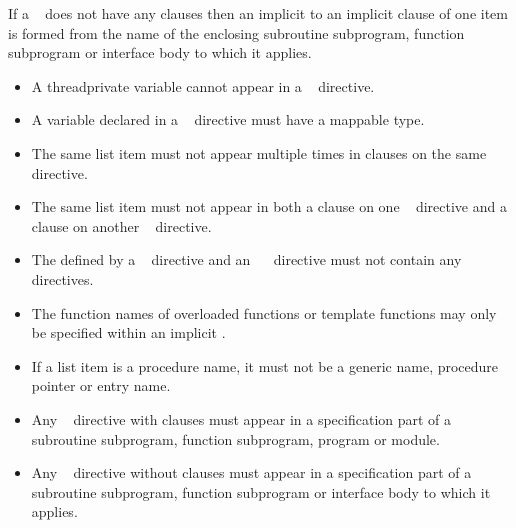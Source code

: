 {{{{If a ~ does not have any clauses then an implicit 
 to an implicit  clause of one item is formed from
the name of the enclosing subroutine subprogram, function subprogram or 
interface body to which it applies.
\fortranspecificend

\restrictions
\begin{itemize}
\item A threadprivate variable cannot appear in a 
      ~ directive.

\item A variable declared in a ~ directive 
      must have a mappable type.

\item The same list item must not appear multiple times in clauses on the same directive.

\item The same list item must not appear in both a  clause on one
~ directive and a  clause on
another ~ directive.

\ccppspecificstart
\item The  defined by a 
      ~ directive and an 
      ~~ directive must not contain
      any ~ directives.
\end{itemize}
\ccppspecificend

\cppspecificstart
\begin{itemize}
\item The function names of overloaded functions or template functions
may only be specified within an implicit .
\end{itemize}
\cppspecificend

\fortranspecificstart
\begin{itemize}
\item If a list item is a procedure name, it must not be a generic name, 
      procedure pointer or entry name.

\item Any ~ directive with clauses must appear 
      in a specification part of a subroutine subprogram, function subprogram,
      program or module.

\item Any ~ directive without clauses must appear 
      in a specification part of a subroutine subprogram, function subprogram 
      or interface body to which it applies.


\end{itemize}}}}}
